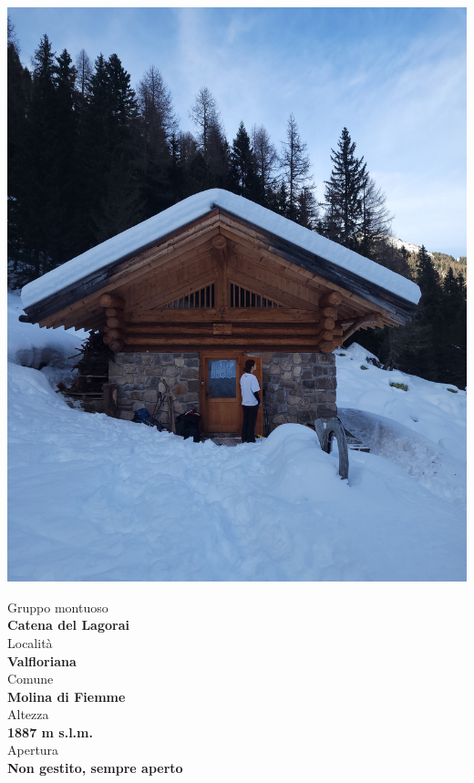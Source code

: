 \documentclass{article}
\begin{document}
\noindent
\begin{minipage}[t]{0.45\textwidth}
  \vspace{0pt} %
  \includegraphics[width=\linewidth]{images/bivacco.jpg}
\end{minipage}%
\hfill
\begin{minipage}[t]{0.5\textwidth}
  \vspace{0pt} %
  
  Gruppo montuoso\\
  \textbf{\large Catena del Lagorai}
  \\[1em] %
  Località\\
  \textbf{\large Valfloriana}
  \\[1em] %
  Comune\\  
  \textbf{\large Molina di Fiemme}
  \\[1em] %
  Altezza\\  
  \textbf{\large 1887 m s.l.m.}
  \\[1em] %
  Apertura\\  
  \textbf{\large Non gestito, sempre aperto}

\end{minipage}
\end{document}
